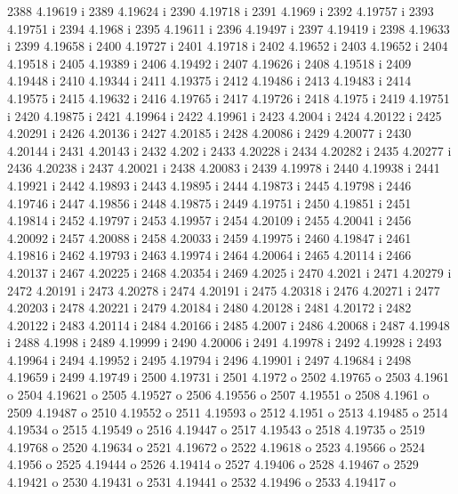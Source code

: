  2388  4.19619  i
 2389  4.19624  i
 2390  4.19718  i
 2391  4.1969  i
 2392  4.19757  i
 2393  4.19751  i
 2394  4.1968  i
 2395  4.19611  i
 2396  4.19497  i
 2397  4.19419  i
 2398  4.19633  i
 2399  4.19658  i
 2400  4.19727  i
 2401  4.19718  i
 2402  4.19652  i
 2403  4.19652  i
 2404  4.19518  i
 2405  4.19389  i
 2406  4.19492  i
 2407  4.19626  i
 2408  4.19518  i
 2409  4.19448  i
 2410  4.19344  i
 2411  4.19375  i
 2412  4.19486  i
 2413  4.19483  i
 2414  4.19575  i
 2415  4.19632  i
 2416  4.19765  i
 2417  4.19726  i
 2418  4.1975  i
 2419  4.19751  i
 2420  4.19875  i
 2421  4.19964  i
 2422  4.19961  i
 2423  4.2004  i
 2424  4.20122  i
 2425  4.20291  i
 2426  4.20136  i
 2427  4.20185  i
 2428  4.20086  i
 2429  4.20077  i
 2430  4.20144  i
 2431  4.20143  i
 2432  4.202  i
 2433  4.20228  i
 2434  4.20282  i
 2435  4.20277  i
 2436  4.20238  i
 2437  4.20021  i
 2438  4.20083  i
 2439  4.19978  i
 2440  4.19938  i
 2441  4.19921  i
 2442  4.19893  i
 2443  4.19895  i
 2444  4.19873  i
 2445  4.19798  i
 2446  4.19746  i
 2447  4.19856  i
 2448  4.19875  i
 2449  4.19751  i
 2450  4.19851  i
 2451  4.19814  i
 2452  4.19797  i
 2453  4.19957  i
 2454  4.20109  i
 2455  4.20041  i
 2456  4.20092  i
 2457  4.20088  i
 2458  4.20033  i
 2459  4.19975  i
 2460  4.19847  i
 2461  4.19816  i
 2462  4.19793  i
 2463  4.19974  i
 2464  4.20064  i
 2465  4.20114  i
 2466  4.20137  i
 2467  4.20225  i
 2468  4.20354  i
 2469  4.2025  i
 2470  4.2021  i
 2471  4.20279  i
 2472  4.20191  i
 2473  4.20278  i
 2474  4.20191  i
 2475  4.20318  i
 2476  4.20271  i
 2477  4.20203  i
 2478  4.20221  i
 2479  4.20184  i
 2480  4.20128  i
 2481  4.20172  i
 2482  4.20122  i
 2483  4.20114  i
 2484  4.20166  i
 2485  4.2007  i
 2486  4.20068  i
 2487  4.19948  i
 2488  4.1998  i
 2489  4.19999  i
 2490  4.20006  i
 2491  4.19978  i
 2492  4.19928  i
 2493  4.19964  i
 2494  4.19952  i
 2495  4.19794  i
 2496  4.19901  i
 2497  4.19684  i
 2498  4.19659  i
 2499  4.19749  i
 2500  4.19731  i
 2501  4.1972  o
 2502  4.19765  o
 2503  4.1961  o
 2504  4.19621  o
 2505  4.19527  o
 2506  4.19556  o
 2507  4.19551  o
 2508  4.1961  o
 2509  4.19487  o
 2510  4.19552  o
 2511  4.19593  o
 2512  4.1951  o
 2513  4.19485  o
 2514  4.19534  o
 2515  4.19549  o
 2516  4.19447  o
 2517  4.19543  o
 2518  4.19735  o
 2519  4.19768  o
 2520  4.19634  o
 2521  4.19672  o
 2522  4.19618  o
 2523  4.19566  o
 2524  4.1956  o
 2525  4.19444  o
 2526  4.19414  o
 2527  4.19406  o
 2528  4.19467  o
 2529  4.19421  o
 2530  4.19431  o
 2531  4.19441  o
 2532  4.19496  o
 2533  4.19417  o
